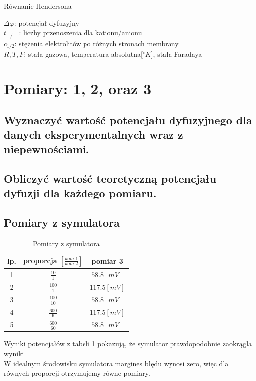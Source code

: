 \documentclass{article}
\begin{document}
    \begin{center}
        Równanie Hendersona \\
    \end{center}
    $\Delta\varphi$: potencjał dyfuzyjny\\
    $t_{+/-}$: liczby przenoszenia dla kationu/anionu\\
    $c_{1/2}$: stężenia elektrolitów po różnych stronach membrany\\
    $R, T, F$: stała gazowa, temperatura absolutna[$^\circ K$], stała Faradaya\\
        
    
\section{Pomiary: 1, 2, oraz 3}

    \subsection{Wyznaczyć wartość potencjału dyfuzyjnego dla danych eksperymentalnych wraz z niepewnościami.}

    \subsection{Obliczyć wartość teoretyczną potencjału dyfuzji dla każdego pomiaru. }

    \subsection{Pomiary z symulatora}


        \begin{table}[!h]
            \centering
            \begin{tabular}{|c|c|c|}\hline
                 lp.&proporcja $[\frac{kom.1}{kom.2}]$ &pomiar 3 \\[3pt] \hline
                 1&  $\frac{10}{1}$& $58.8[mV]$ \\ [3pt]\hline
                 2&  $\frac{100}{1}$& $117.5[mV]$ \\ [3pt]\hline
                 3&  $\frac{100}{10}$& $58.8[mV]$ \\ [3pt]\hline
                 4&  $\frac{600}{6}$& $117.5[mV]$ \\ [3pt]\hline
                 5&  $\frac{600}{60}$& $58.8[mV]$ \\ [3pt]\hline
            \end{tabular}
            \caption{Pomiary z symulatora}
            \label{tab:symulator}
        \end{table}
        \FloatBarrier
        Wyniki potencjałów z tabeli \ref{tab:symulator} pokazują, że symulator prawdopodobnie zaokrągla wyniki\\[1\baselineskip]
        W idealnym środowisku symulatora margines błędu wynosi zero, więc dla równych proporcji otrzymujemy równe pomiary.
\end{document}
